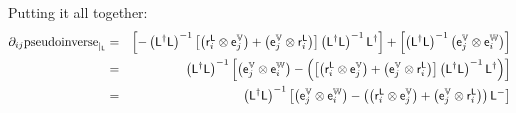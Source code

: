 Putting it all together:
\begin{eqnarray}
{\partial}_{ij}{\mathrm{pseudoinverse}}_{\mid_{\mathsf{L}}}
& = &
\left[
-
\left( \mathsf{L}^{\dagger} \mathsf{L} \right)^{-1}
\left[
\left( \mathsf{r}_i^{\mathsf{L}} \otimes \mathsf{e}_j^{\mathbb{V}} \right)
+
\left( \mathsf{e}_j^{\mathbb{V}} \otimes \mathsf{r}_i^{\mathsf{L}} \right)
\right]
\left( \mathsf{L}^{\dagger} \mathsf{L} \right)^{-1}
\mathsf{L}^{\dagger}
\right]
+
\left[
\left( \mathsf{L}^{\dagger} \mathsf{L} \right)^{-1}
\left( \mathsf{e}_j^{\mathbb{V}} \otimes \mathsf{e}_i^{\mathbb{W}} \right)
\right]
\nonumber
\\
& = &
\left( \mathsf{L}^{\dagger} \mathsf{L} \right)^{-1}
\left[
\left( \mathsf{e}_j^{\mathbb{V}} \otimes \mathsf{e}_i^{\mathbb{W}} \right)
-
\left(
\left[
\left( \mathsf{r}_i^{\mathsf{L}} \otimes \mathsf{e}_j^{\mathbb{V}} \right)
+
\left( \mathsf{e}_j^{\mathbb{V}} \otimes \mathsf{r}_i^{\mathsf{L}} \right)
\right]
\left( \mathsf{L}^{\dagger} \mathsf{L} \right)^{-1}
\mathsf{L}^{\dagger}
\right)
\right]
\nonumber
\\
& = &
\left( \mathsf{L}^{\dagger} \mathsf{L} \right)^{-1}
\left[
\left( \mathsf{e}_j^{\mathbb{V}} \otimes \mathsf{e}_i^{\mathbb{W}} \right)
-
\left(
\left( \mathsf{r}_i^{\mathsf{L}} \otimes \mathsf{e}_j^{\mathbb{V}} \right)
+
\left( \mathsf{e}_j^{\mathbb{V}} \otimes \mathsf{r}_i^{\mathsf{L}} \right)
\right)
\mathsf{L}^{-}
\right]
\end{eqnarray}

\restoregeometry

